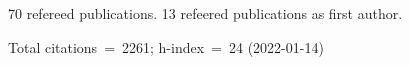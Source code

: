 70 refereed publications. 13 refeered publications as first author.

Total citations~=~2261; h-index~=~24 (2022-01-14)
